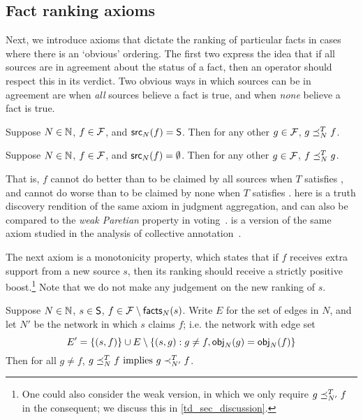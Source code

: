 \subsection{Fact ranking axioms}
\label{td_sec_fact_ranking_axioms}

Next, we introduce axioms that dictate the ranking of particular facts in cases
where there is an `obvious' ordering. The first two
express the idea that if all sources are in agreement about the status of a
fact, then an operator should respect this in its verdict. Two obvious ways in
which sources can be in agreement are when \emph{all} sources believe a fact is
true, and when \emph{none} believe a fact is true.

\begin{axiom}[\unanimity{}]
Suppose $N \in \N$, $f \in \F$, and $\src_N(f) = \S$. Then for any other $g \in
\F$, $g \fle_N^T f$.
\end{axiom}

\begin{axiom}[\groundedness{}]
Suppose $N \in \N$, $f \in \F$, and $\src_N(f) = \emptyset$. Then for any other
$g \in \F$, $f \fle_N^T g$.
\end{axiom}

That is, $f$ cannot do better than to be claimed by all sources when $T$
satisfies \unanimity{}, and cannot do worse than to be claimed by none when $T$
satisfies \groundedness{}.
%
\unanimity{} here is a truth discovery rendition of the same axiom in judgment
aggregation, and can also be compared to the \emph{weak Paretian} property in
voting~\cite{brandt2016introduction}. \groundedness{} is a version of the same
axiom studied in the analysis of collective annotation~\cite{kruger2014}.

The next axiom is a monotonicity property, which states that if $f$
receives extra support from a new source $s$, then its ranking should receive a
strictly positive boost.\footnote{One could also consider the weak version, in
which we only require $g \fle_{N'}^T f$ in the consequent; we discuss this in
\cref{td_sec_discussion}.} Note that we do not make any judgement on the new
ranking of $s$.

\begin{axiom}[\monotonicity{}]
Suppose $N \in \N$, $s \in \S$, $f \in \F \setminus \facts_N(s)$. Write
$E$ for the set of edges in $N$, and let $N'$ be the network in which $s$
claims $f$; i.e. the network with edge set
\[
    E' = \{(s, f)\} \cup E \setminus \{(s, g) : g \ne f, \obj_N(g) = \obj_N(f) \}
\]
Then for all $g \ne f$,
    $g \fle_N^T f\  \textrm{implies } g \flt_{N'}^T f$.
\end{axiom}

